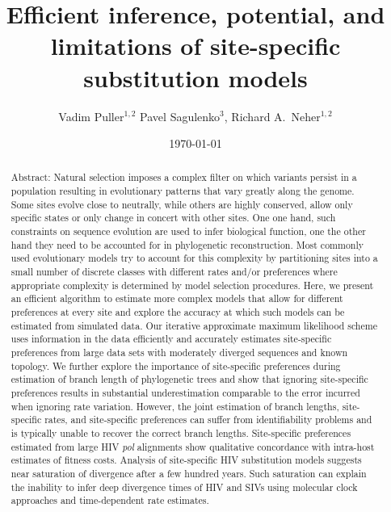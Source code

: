 \documentclass[aps,rmp,twocolumn,linenumbers]{revtex4-1}
\begin{document}
\title{Efficient inference, potential, and limitations of site-specific substitution models}
\author{Vadim Puller$^{1,2}$ Pavel Sagulenko$^{3}$, Richard A.~Neher$^{1,2}$}

\date{\today}

\begin{abstract}
Abstract: Natural selection imposes a complex filter on which variants persist in a population resulting in evolutionary patterns that vary greatly along the genome.
Some sites evolve close to neutrally, while others are highly conserved, allow only specific states or only change in concert with other sites.
One one hand, such constraints on sequence evolution are used to infer biological function, one the other hand they need to be accounted for in phylogenetic reconstruction.
Most commonly used evolutionary models try to account for this complexity by partitioning sites into a small number of discrete classes with different rates and/or preferences where appropriate complexity is determined by model selection procedures.
Here, we present an efficient algorithm to estimate more complex models that allow for different preferences at every site and explore the accuracy at which such models can be estimated from simulated data.
Our iterative approximate maximum likelihood scheme uses information in the data efficiently and accurately estimates site-specific preferences from large data sets with moderately diverged sequences and known topology.
We further explore the importance of site-specific preferences during estimation of branch length of phylogenetic trees and show that ignoring site-specific preferences results in substantial underestimation comparable to the error incurred when ignoring rate variation.
However, the joint estimation of branch lengths, site-specific rates, and site-specific preferences can suffer from identifiability problems and is typically unable to recover the correct branch lengths.
Site-specific preferences estimated from large HIV \emph{pol} alignments show qualitative concordance with intra-host estimates of fitness costs.
Analysis of site-specific HIV substitution models suggests near saturation of divergence after a few hundred years.
Such saturation can explain the inability to infer deep divergence times of HIV and SIVs using molecular clock approaches and time-dependent rate estimates.
\end{abstract}
\end{document}
